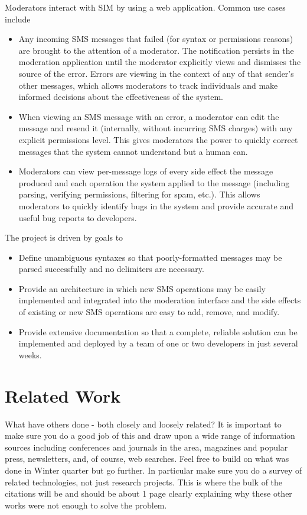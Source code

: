 \documentclass{acm_proc_article-sp}
\begin{document}
Moderators interact with SIM by using a web application. Common use cases include

\begin{itemize}
\item Any incoming SMS messages that failed (for syntax or permissions reasons) are brought to the attention of a moderator. The notification persists in the moderation application until the moderator explicitly views and dismisses the source of the error. Errors are viewing in the context of any of that sender's other messages, which allows moderators to track individuals and make informed decisions about the effectiveness of the system.
\item When viewing an SMS message with an error, a moderator can edit the message and resend it (internally, without incurring SMS charges) with any explicit permissions level. This gives moderators the power to quickly correct messages that the system cannot understand but a human can.
\item Moderators can view per-message logs of every side effect the message produced and each operation the system applied to the message (including parsing, verifying permissions, filtering for spam, etc.). This allows moderators to quickly identify bugs in the system and provide accurate and useful bug reports to developers.
\end{itemize}

The project is driven by goals to 

\begin{itemize}
\item Define unambiguous syntaxes so that poorly-formatted messages may be parsed successfully and no delimiters are necessary.
\item Provide an architecture in which new SMS operations may be easily implemented and integrated into the moderation interface and the side effects of existing or new SMS operations are easy to add, remove, and modify.
\item Provide extensive documentation so that a complete, reliable solution can be implemented and deployed by a team of one or two developers in just several weeks.
\end{itemize}

\section{Related Work}
What have others done - both closely and loosely related?  It is important to make sure you do a good job of this and draw upon a wide range of information sources including conferences and journals in the area, magazines and popular press, newsletters, and, of course, web searches.  Feel free to build on what was done in Winter quarter but go further.  In particular make sure you do a survey of related technologies, not just research projects.  This is where the bulk of the citations will be and should be about 1 page clearly explaining why these other works were not enough to solve the problem.
\end{document}
